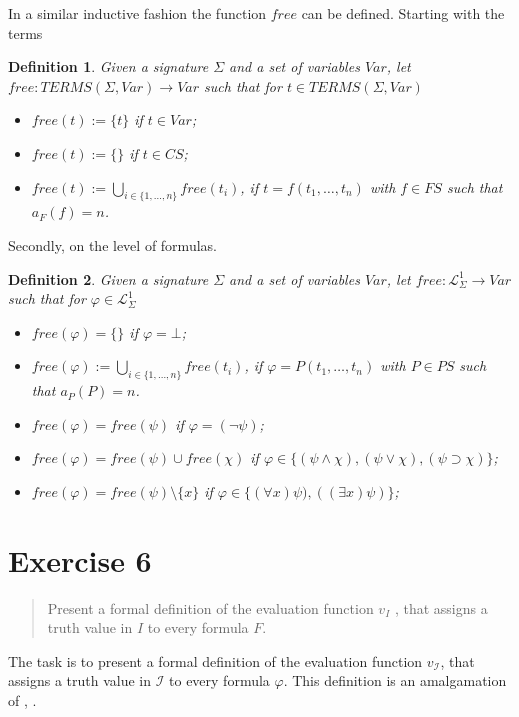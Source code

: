 \documentclass[11pt,a4paper]{article}
\newtheorem{mydef}{Definition}
\begin{document}
In a similar inductive fashion the function $\textit{free}$ can be defined. Starting with the terms

\begin{mydef}
Given a signature $\Sigma$ and a set of variables $Var$, let $free:TERMS(\Sigma,Var) \to Var$ such that for $t \in TERMS(\Sigma,Var)$
\begin{itemize}
\item $free(t):=\{t\}$ if $t\in Var$;
\item $free(t):=\{\}$ if $t\in CS$;
\item $free(t):= \bigcup_{i \in \{1,\dots,n\}} free(t_i)$, if $t=f(t_1,\dots,t_n)$ with $f \in FS$ such that $a_F(f)=n$.
\end{itemize}
\end{mydef}

Secondly, on the level of formulas. 

\begin{mydef}
Given a signature $\Sigma$ and a set of variables $Var$, let $free:\mathcal{L}_{\Sigma}^1 \to Var$ such that for $\varphi \in \mathcal{L}_{\Sigma}^1$
\begin{itemize}
\item $free(\varphi)=\{\}$ if $\varphi=\bot$;
\item $free(\varphi):= \bigcup_{i \in \{1,\dots,n\}} free(t_i)$, if $\varphi=P(t_1,\dots,t_n)$ with $P \in PS$ such that $a_P(P)=n$.
\item $free(\varphi)=free(\psi)$ if $\varphi=(\neg \psi)$;
\item $free(\varphi)=free(\psi) \cup free(\chi)$ if $\varphi \in \{(\psi \land \chi),(\psi \lor \chi),(\psi \supset \chi)\}$;
\item $free(\varphi)=free(\psi) \setminus \{x\}$ if $\varphi \in \{(\forall x) \psi),((\exists  x) \psi)\}$;
\end{itemize}
\end{mydef}


\section*{Exercise 6}
\begin{quote}
Present a formal definition of the evaluation function $v_I$ , that assigns a truth value in $I$ to every formula $F$.
\end{quote}

The task is to present a formal definition of the evaluation function $v_{\mathcal{I}}$, that assigns a truth value in $\mathcal{I}$ to every formula $\varphi$. This definition is an amalgamation of 
\cite{LoCo}, \cite{kbs}.
\end{document}
